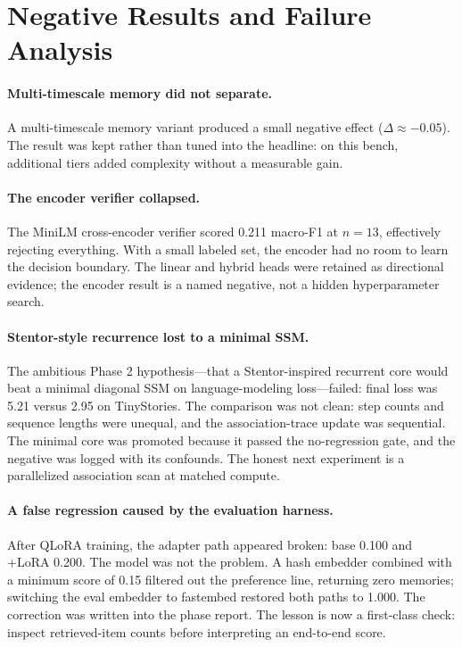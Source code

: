 \documentclass[11pt]{article}
\begin{document}
\section{Negative Results and Failure Analysis}

\paragraph{Multi-timescale memory did not separate.}
A multi-timescale memory variant produced a small negative effect ($\Delta \approx -0.05$). The result was kept rather than tuned into the headline: on this bench, additional tiers added complexity without a measurable gain.

\paragraph{The encoder verifier collapsed.}
The MiniLM cross-encoder verifier scored 0.211 macro-F1 at $n=13$, effectively rejecting everything. With a small labeled set, the encoder had no room to learn the decision boundary. The linear and hybrid heads were retained as directional evidence; the encoder result is a named negative, not a hidden hyperparameter search.

\paragraph{Stentor-style recurrence lost to a minimal SSM.}
The ambitious Phase 2 hypothesis---that a Stentor-inspired recurrent core would beat a minimal diagonal SSM on language-modeling loss---failed: final loss was 5.21 versus 2.95 on TinyStories. The comparison was not clean: step counts and sequence lengths were unequal, and the association-trace update was sequential. The minimal core was promoted because it passed the no-regression gate, and the negative was logged with its confounds. The honest next experiment is a parallelized association scan at matched compute.

\paragraph{A false regression caused by the evaluation harness.}
After QLoRA training, the adapter path appeared broken: base 0.100 and +LoRA 0.200. The model was not the problem. A hash embedder combined with a minimum score of 0.15 filtered out the preference line, returning zero memories; switching the eval embedder to fastembed restored both paths to 1.000. The correction was written into the phase report. The lesson is now a first-class check: inspect retrieved-item counts before interpreting an end-to-end score.
\end{document}
